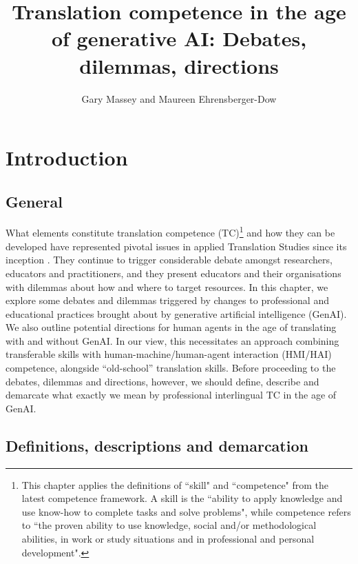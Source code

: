 \documentclass[output=paper]{langscibook}
\author{Gary Massey\orcid{}\affiliation{ZHAW Zurich University of Applied Sciences, Switzerland (ret.)} and Maureen Ehrensberger-Dow\orcid{}\affiliation{ZHAW Zurich University of Applied Sciences, Switzerland (ret.)}}
\title[Translation competence in the age of generative AI]{Translation competence in the age of generative AI: Debates, dilemmas, directions}
\begin{document}
\maketitle




\section{Introduction}

\subsection{General}

What elements constitute translation competence (TC)\footnote{This chapter applies the definitions of ``skill" and ``competence" from the latest \citet[3]{emt_european_2022} competence framework. A skill is the ``ability to apply knowledge and use know-how to complete tasks and solve problems", while competence refers to ``the proven ability to use knowledge, social and/or methodological abilities, in work or study situations and in professional and personal development".\label{fn1}} and how they can be developed have represented pivotal issues in applied Translation Studies since its inception \citep[77]{holmes1988}. They continue to trigger considerable debate amongst researchers, educators and practitioners, and they present educators and their organisations with dilemmas about how and where to target resources. In this chapter, we explore some debates and dilemmas triggered by changes to professional and educational practices brought about by generative artificial intelligence (GenAI). We also outline potential directions for human agents in the age of translating with and without GenAI. In our view, this necessitates an approach combining transferable skills with human-machine/human-agent interaction (HMI/HAI) competence, alongside “old-school” translation skills. Before proceeding to the debates, dilemmas and directions, however, we should define, describe and demarcate what exactly we mean by professional interlingual TC in the age of GenAI.

\subsection{Definitions, descriptions and demarcation} \label{sec:1:1.2}
\end{document}
